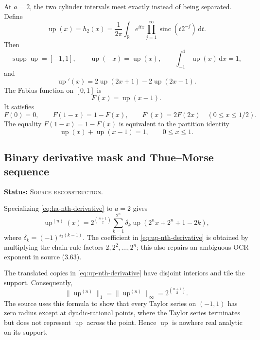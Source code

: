 \documentclass[11pt,oneside]{article}
\theoremstyle{definition}
\theoremstyle{remark}
\newcommand{\Up}{\operatorname{up}}
\newcommand{\sinc}{\operatorname{sinc}}
\newcommand{\supp}{\operatorname{supp}}
\newcommand{\R}{\mathbb{R}}
\newcommand{\dd}{\,\mathrm{d}}
\newcommand{\SourceStatus}{\textcolor{SourceBlue}{\textsc{Source reconstruction}}}
\newcommand{\status}[1]{\par\smallskip\noindent\textbf{Status:} #1.\par\smallskip}
\newcommand{\bitsum}{s_2}
\begin{document}
At \(a=2\), the two cylinder intervals meet exactly instead of being separated.  Define
\begin{equation}
  \Up(x)=h_2(x)=\frac1{2\pi}\int_{\R}e^{itx}
     \prod_{j=1}^{\infty}\sinc(t2^{-j})\dd t.
  \label{eq:up-fourier}
\end{equation}
Then
\begin{equation}
  \supp\Up=[-1,1],\qquad \Up(-x)=\Up(x),\qquad
  \int_{-1}^{1}\Up(x)\dd x=1,
  \label{eq:up-basic}
\end{equation}
and
\begin{equation}
  \Up'(x)=2\Up(2x+1)-2\Up(2x-1).
  \label{eq:up-dfe}
\end{equation}
The Fabius function on \([0,1]\) is
\begin{equation}
  F(x)=\Up(x-1).
  \label{eq:fabius-up}
\end{equation}
It satisfies
\begin{equation}
  F(0)=0,
  \qquad F(1-x)=1-F(x),
  \qquad F'(x)=2F(2x)\quad(0\le x\le1/2).
  \label{eq:fabius-functional}
\end{equation}
The equality \(F(1-x)=1-F(x)\) is equivalent to the partition identity
\begin{equation}
  \Up(x)+\Up(x-1)=1,
  \qquad 0\le x\le1.
  \label{eq:up-partition}
\end{equation}

\subsection{Binary derivative mask and Thue--Morse sequence}
\status{\SourceStatus}

Specializing \eqref{eq:ha-nth-derivative} to \(a=2\) gives
\begin{equation}
  \Up^{(n)}(x)=2^{\binom{n+1}{2}}
  \sum_{k=1}^{2^n}\delta_k
  \Up\!\left(2^n x+2^n+1-2k\right),
  \label{eq:up-nth-derivative}
\end{equation}
where \(\delta_k=(-1)^{\bitsum(k-1)}\).  The coefficient in \eqref{eq:up-nth-derivative} is obtained by multiplying the chain-rule factors \(2,2^2,\ldots,2^n\); this also repairs an ambiguous OCR exponent in source (3.63).

The translated copies in \eqref{eq:up-nth-derivative} have disjoint interiors and tile the support.  Consequently,
\begin{equation}
  \|\Up^{(n)}\|_1=\|\Up^{(n)}\|_\infty
  =2^{\binom{n+1}{2}}.
  \label{eq:up-norms}
\end{equation}
The source uses this formula to show that every Taylor series on \((-1,1)\) has zero radius except at dyadic-rational points, where the Taylor series terminates but does not represent \(\Up\) across the point.  Hence \(\Up\) is nowhere real analytic on its support.
\end{document}
